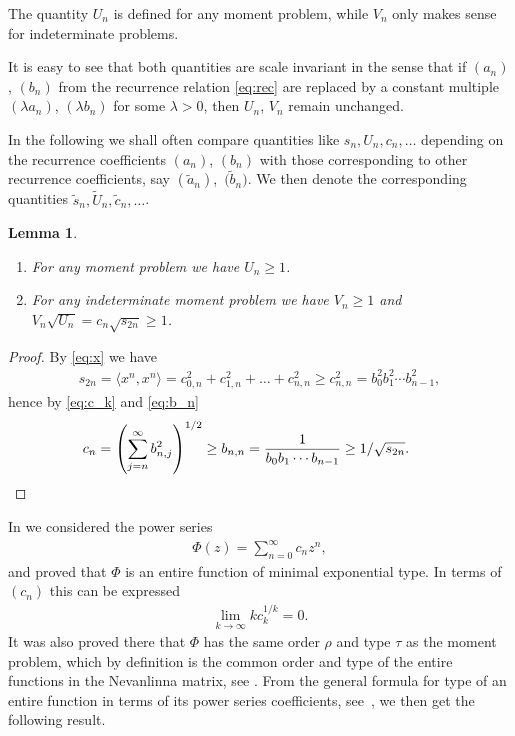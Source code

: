 \documentclass[11pt]{article}
\numberwithin{equation}{section}
\newtheorem{lem}[thm]{Lemma}
\begin{document}
The quantity $U_n$ is defined for any moment problem, while $V_n$ only makes sense for indeterminate problems.

It is easy to see that both quantities are scale invariant in the sense that if $(a_n)$, $(b_n)$ from the recurrence relation \eqref{eq:rec} are replaced by a constant multiple $(\lambda a_n)$, $(\lambda b_n)$ for some $\lambda>0$, then $U_n$, $V_n$ remain unchanged.

In the following we shall often compare quantities like $s_n,U_n,c_n,\ldots$ depending on the recurrence coefficients $(a_n)$, $(b_n)$ with those corresponding to other recurrence coefficients, say $(\tilde{a}_n)$,~$\big(\tilde{b}_n\big)$. We then denote the corresponding quantities $\tilde{s}_n,\tilde{U}_n,\tilde{c}_n,\ldots$.

\begin{lem}\label{thm:Un}\quad
\begin{enumerate}\itemsep=0pt
\item[$(i)$] For any moment problem we have $U_n\ge 1$.
 \item[$(ii)$] For any indeterminate moment problem we have $V_n\ge 1$ and $V_n\sqrt{U_n}=c_n\sqrt{s_{2n}}\ge 1$.
\end{enumerate}
\end{lem}

\begin{proof}By \eqref{eq:x} we have
\begin{gather*}
s_{2n}=\langle x^n,x^n\rangle=c_{0,n}^2+c_{1,n}^2+\dots +c_{n,n}^2 \ge c_{n,n}^2= b_0^2b_1^2\cdots b_{n-1}^2,
\end{gather*}
hence by \eqref{eq:c_k} and \eqref{eq:b_n}
\begin{gather*}
c_n=\left (\sum_{j=n}^\infty b_{n,j}^2\right )^{1/2}\ge b_{n,n}={1\over b_0b_1\cdots b_{n-1}} \ge 1/\sqrt{s_{2n}}.\tag*{\qed}
\end{gather*}\renewcommand{\qed}{}
\end{proof}

In \cite[Section 3]{B:S2} we considered the power series
\begin{gather*}
\Phi(z)=\sum_{n=0}^\infty c_nz^n,
\end{gather*}
and proved that $\Phi$ is an entire function of minimal exponential type. In terms of $(c_n)$ this
can be expressed
\begin{gather}\label{eq:minexpt}
\lim_{k\to\infty} k c_k^{1/k} =0.
\end{gather}
It was also proved there that $\Phi$ has the same order $\rho$ and type $\tau$ as the moment problem, which by definition is the common order and type of the entire functions in the Nevanlinna matrix, see \cite{B:P,B:P:H}. From the general formula for type of an entire function in terms of its power series coefficients, see~\cite{Le}, we then get the following result.
\end{document}
